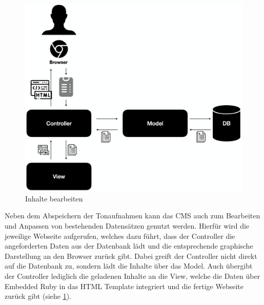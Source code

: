 \begin{figure}
	\centering
	\includegraphics[width=0.5\linewidth]{Assets/PluraPolit-Softwaresystem.004}
	\caption{Inhalte bearbeiten}
	\label{fig:plurapolit-edit}
\end{figure}

Neben dem Abspeichern der Tonaufnahmen kann das CMS auch zum Bearbeiten und Anpassen von bestehenden Datensätzen genutzt werden. Hierfür wird die jeweilige Webseite aufgerufen, welches dazu führt, dass der Controller die angeforderten Daten aus der Datenbank lädt und die entsprechende graphische Darstellung an den Browser zurück gibt. Dabei greift der Controller nicht direkt auf die Datenbank zu, sondern lädt die Inhalte über das Model.
Auch übergibt der Controller lediglich die geladenen Inhalte an die View, welche  die Daten über Embedded Ruby in das HTML Template integriert und die fertige Webseite zurück gibt (siehe \cref{fig:plurapolit-edit}).

